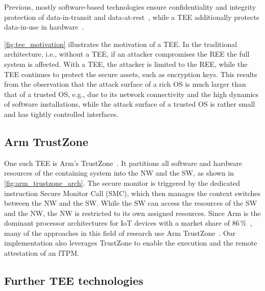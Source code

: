 
Previous, mostly software-based technologies ensure confidentiality and integrity protection of data-in-transit and data-at-rest~\cite{Pecholt2022}, while a \ac{TEE} additionally protects data-in-use in hardware~\cite{Pecholt2022, Lee:EECS-2022-96}.


\autoref{fig:tee_motivation} illustrates the motivation of a \ac{TEE}\@.
In the traditional architecture, i.e., without a \ac{TEE}, if an attacker compromises the \ac{REE} the full system is affected.
With a \ac{TEE}, the attacker is limited to the \ac{REE}, while the \ac{TEE} continues to protect the secure assets, such as encryption keys.
This results from the observation that the attack surface of a rich OS is much larger than that of a trusted OS, e.g., due to its network connectivity and the high dynamics of software installations, while the attack surface of a trusted OS is rather small and has tightly controlled interfaces.



\subsection{Arm TrustZone}

One such \ac{TEE} is Arm's TrustZone~\cite{ARM09, Ngabonziza2016}. It partitions all software and hardware resources of the containing system into the \ac{NW} and the \ac{SW}, as shown in \autoref{fig:arm_trustzone_arch}. The secure monitor is triggered by the dedicated instruction Secure Monitor Call (SMC), which then manages the context switches between the \ac{NW} and the \ac{SW}.
While the \ac{SW} can access the resources of the \ac{SW} and the \ac{NW}, the \ac{NW} is restricted to its own assigned resources.
Since Arm is the dominant processor architectures for IoT devices with a market share of 86\,\%~\cite{eclipse}, many of the approaches in this field of research use Arm TrustZone~\cite{Valadares2021}.
Our implementation also leverages TrustZone to enable the execution and the remote attestation of an fTPM\@.



\subsection{Further TEE technologies}

